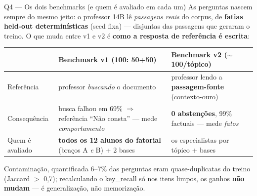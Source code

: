 \documentclass[10pt,aspectratio=169]{beamer}
\newcommand{\ganho}[1]{\textcolor{okgreen}{\textbf{#1}}}
\begin{document}
\begin{frame}{Q4 — Os dois benchmarks (e quem é avaliado em cada um)}
  \small As perguntas nascem sempre do mesmo jeito: o professor 14B lê \emph{passagens reais} do
  corpus, de \textbf{fatias held-out determinísticas} (seed fixa) — disjuntas das passagens que
  geraram o treino. O que muda entre v1 e v2 é \textbf{como a resposta de referência é escrita}:
  \vspace{4pt}
  \begin{tabular}{@{}p{}p{}p{}@{}}
    \toprule
    & \textbf{Benchmark v1 (100: 50+50)} & \textbf{Benchmark v2 ($\sim$100/tópico)} \\
    \midrule
    Referência & professor \emph{buscando} o documento & professor lendo a \textbf{passagem-fonte}
      (contexto-ouro) \\[2pt]
    Consequência & busca falhou em 69\% $\Rightarrow$ referência ``Não consta'' —
      mede \emph{comportamento} & \ganho{0 abstenções}, 99\% factuais —
      mede \emph{fatos} \\[2pt]
    Quem é avaliado & \textbf{todos os 12 alunos do fatorial} (braços A \emph{e} B) + 2 bases &
      os especialistas por tópico + bases \\
    \bottomrule
  \end{tabular}
  \vspace{5pt}
  \begin{block}{\small Contaminação, quantificada}
    \small 6--7\% das perguntas eram quase-duplicatas do treino (Jaccard $>$ 0,7); recalculando o
    key\_recall só nos itens limpos, os ganhos \textbf{não mudam} — é generalização, não memorização.
  \end{block}
\end{frame}
\end{document}
